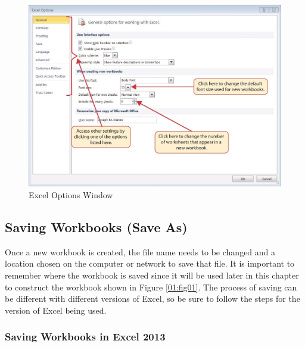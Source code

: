 \begin{figure}[H]
	\centering
	\includegraphics[width=\maxwidth{.95\linewidth}]{gfx/ch01_fig10}
	\caption{Excel Options Window}
	\label{01:fig10}
\end{figure}

\subsection{Saving Workbooks (Save As)}

Once a new workbook is created, the file name needs to be changed and a location chosen on the computer or network to save that file. It is important to remember where the workbook is saved since it will be used later in this chapter to construct the workbook shown in Figure \ref{01:fig01}. The process of saving can be different with different versions of Excel, so be sure to follow the steps for the version of Excel being used.

\subsubsection{Saving Workbooks in Excel 2013}

